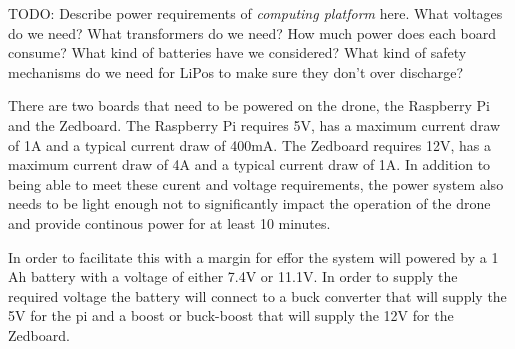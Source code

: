 TODO: Describe power requirements of \textit{computing platform} here. What voltages do we need? What transformers do we need? How much power does each board consume? What kind of batteries have we considered? What kind of safety mechanisms do we need for LiPos to make sure they don't over discharge?

There are two boards that need to be powered on the drone, the Raspberry Pi and the Zedboard. The Raspberry Pi requires
5V, has a maximum current draw of 1A and a typical current draw of 400mA. The Zedboard requires 12V, has a maximum current draw of
4A and a typical current draw of 1A. In addition to being able to meet these curent and voltage requirements, the power system also
needs to be light enough not to significantly impact the operation of the drone and provide continous power for at least 10 minutes.

In order to facilitate this with a margin for effor the system will powered by a 1 Ah battery with a voltage of either 7.4V or 11.1V.
In order to supply the required voltage the battery will connect to a buck converter that will supply the 5V for the pi and a boost or
buck-boost that will supply the 12V for the Zedboard.
